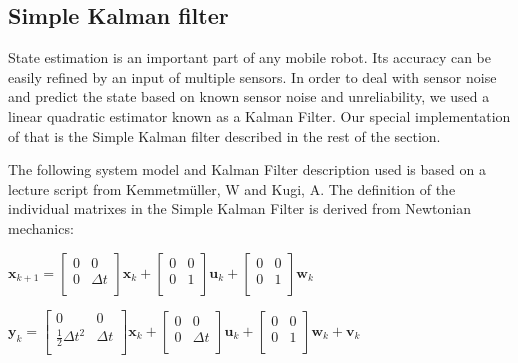 \documentclass[class=article, crop=false]{standalone}
\begin{document}
\subsection{Simple Kalman filter}\label{subsec:simple-kalman}
State estimation is an important part of any mobile robot. Its accuracy can be easily refined by an input of multiple sensors. In order to deal with sensor noise and predict the state based on known sensor noise and unreliability, we used a linear quadratic estimator known as a Kalman Filter. Our special implementation of that is the Simple Kalman filter described in the rest of the section.

The following system model and Kalman Filter description used is based on a lecture script from Kemmetm{\"u}ller, W and Kugi, A\cite{regelungssysteme1}. The definition of the individual matrixes in the Simple Kalman Filter is derived from Newtonian mechanics:

\vspace{0.5cm}
\hspace{2cm}
$ \textbf{x}_{k+1} =
\begin{bmatrix}
  0 & 0 \\
  0 & \Delta t \\
\end{bmatrix}
\textbf{x}_k +
\begin{bmatrix}
  0 & 0 \\
  0 & 1 \\
\end{bmatrix}
\textbf{u}_k +
\begin{bmatrix}
  0 & 0 \\
  0 & 1 \\
\end{bmatrix}
\textbf{w}_k $

\vspace{0.5cm}
\hspace{2cm}
$ \textbf{y}_k =
\begin{bmatrix}
  0 & 0 \\
  \frac{1}{2} \Delta t^2 & \Delta t \\
\end{bmatrix}
\textbf{x}_k +
\begin{bmatrix}
    0 & 0 \\
    0 & \Delta t \\
\end{bmatrix}
\textbf{u}_k +
\begin{bmatrix}
    0 & 0 \\
    0 & 1 \\
\end{bmatrix}
\textbf{w}_k +
\textbf{v}_k $
\label{eqn:system}
\end{document}
